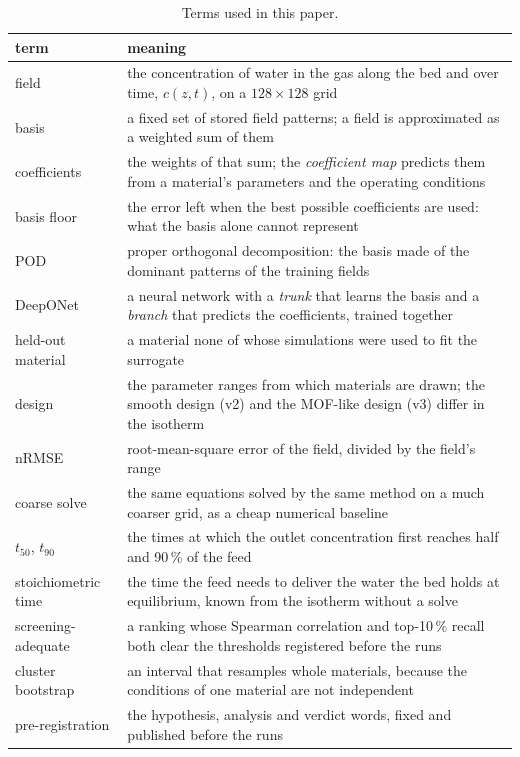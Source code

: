 \documentclass[10pt,a4paper]{article}
\begin{document}
\begin{table}[!tbp]
\centering
\caption{Terms used in this paper.}
\label{tab:terms}
\small
\begin{tabular}{@{}>{\raggedright\arraybackslash}p{}>{\raggedright\arraybackslash}p{}@{}}
\toprule
term & meaning \\
\midrule
field & the concentration of water in the gas along the bed and over time, \(c(z,t)\), on a
\(128 \times 128\) grid \\
basis & a fixed set of stored field patterns; a field is approximated as a weighted sum of them \\
coefficients & the weights of that sum; the \emph{coefficient map} predicts them from a
material's parameters and the operating conditions \\
basis floor & the error left when the best possible coefficients are used: what the basis
alone cannot represent \\
POD & proper orthogonal decomposition: the basis made of the dominant patterns of the training
fields \\
DeepONet & a neural network with a \emph{trunk} that learns the basis and a \emph{branch} that
predicts the coefficients, trained together \\
held-out material & a material none of whose simulations were used to fit the surrogate \\
design & the parameter ranges from which materials are drawn; the smooth design (v2) and the
MOF-like design (v3) differ in the isotherm \\
nRMSE & root-mean-square error of the field, divided by the field's range \\
coarse solve & the same equations solved by the same method on a much coarser grid, as a
cheap numerical baseline \\
\(t_{50}\), \(t_{90}\) & the times at which the outlet concentration first reaches half and
90\,\% of the feed \\
stoichiometric time & the time the feed needs to deliver the water the bed holds at
equilibrium, known from the isotherm without a solve \\
screening-adequate & a ranking whose Spearman correlation and top-10\,\% recall both clear
the thresholds registered before the runs \\
cluster bootstrap & an interval that resamples whole materials, because the conditions of one
material are not independent \\
pre-registration & the hypothesis, analysis and verdict words, fixed and published before the
runs \\
\bottomrule
\end{tabular}
\end{table}
\end{document}
